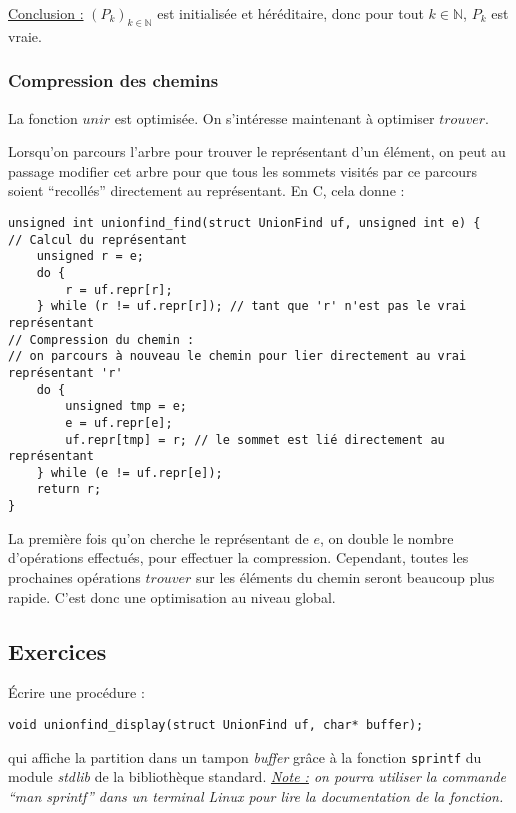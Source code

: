 \documentclass[../../../main.tex]{subfiles}
\begin{document}
\underline{Conclusion :} $(P_k)_{k\in\mathbb{N}}$ est initialisée et héréditaire, donc pour tout $k\in\mathbb{N}$, $P_k$ est vraie.
\subsubsection{Compression des chemins}
La fonction $unir$ est optimisée. On s'intéresse maintenant à optimiser $trouver$. 

Lorsqu'on parcours l'arbre pour trouver le représentant d'un élément, on peut au passage modifier cet arbre pour que tous les sommets visités par ce parcours soient ``recollés'' directement au représentant. En C, cela donne :
\begin{verbatim}
unsigned int unionfind_find(struct UnionFind uf, unsigned int e) {
// Calcul du représentant
	unsigned r = e;
	do {
		r = uf.repr[r];
	} while (r != uf.repr[r]); // tant que 'r' n'est pas le vrai représentant
// Compression du chemin :
// on parcours à nouveau le chemin pour lier directement au vrai représentant 'r'
	do {
		unsigned tmp = e;
		e = uf.repr[e];
		uf.repr[tmp] = r; // le sommet est lié directement au représentant
	} while (e != uf.repr[e]);
	return r;
}
\end{verbatim}
La première fois qu'on cherche le représentant de $e$, on double le nombre d'opérations effectués, pour effectuer la compression. Cependant, toutes les prochaines opérations $trouver$ sur les éléments du chemin seront beaucoup plus rapide. C'est donc une optimisation au niveau global.
\subsection{Exercices}
 Écrire une procédure :
\begin{center}
\texttt{void unionfind_display(struct UnionFind uf, char* buffer);}
\end{center}
qui affiche la partition dans un tampon \textit{buffer} grâce à la fonction \texttt{sprintf} du module \textit{stdlib} de la bibliothèque standard.\newline
\textit{\underline{Note :} on pourra utiliser la commande ``man sprintf'' dans un terminal Linux pour lire la documentation de la fonction.}
\end{document}
